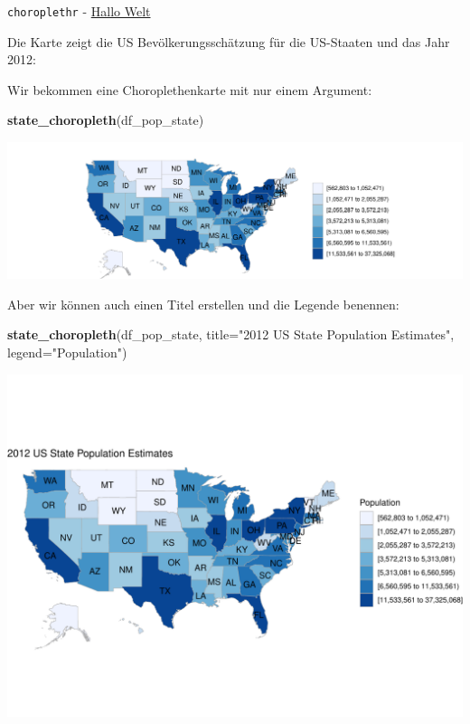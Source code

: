 \documentclass[ignorenonframetext,]{beamer}
\newenvironment{Shaded}{\begin{snugshade}}{\end{snugshade}}
\newcommand{\DataTypeTok}[1]{\textcolor[rgb]{0.13,0.29,0.53}{#1}}
\newcommand{\KeywordTok}[1]{\textcolor[rgb]{0.13,0.29,0.53}{\textbf{#1}}}
\newcommand{\NormalTok}[1]{#1}
\newcommand{\StringTok}[1]{\textcolor[rgb]{0.31,0.60,0.02}{#1}}
\begin{document}
\begin{frame}[fragile]{\texttt{choroplethr} -
\href{http://mirrors.softliste.de/cran/web/packages/choroplethr/vignettes/a-introduction.html}{Hallo
Welt}}
\protect\hypertarget{choroplethr---hallo-welt}{}

Die Karte zeigt die US Bevölkerungsschätzung für die US-Staaten und das
Jahr 2012:

Wir bekommen eine Choroplethenkarte mit nur einem Argument:

\begin{Shaded}
\begin{Highlighting}[]
\KeywordTok{state_choropleth}\NormalTok{(df_pop_state)}
\end{Highlighting}
\end{Shaded}

\includegraphics{Choroplethen_files/figure-beamer/unnamed-chunk-18-1.pdf}

Aber wir können auch einen Titel erstellen und die Legende benennen:

\begin{Shaded}
\begin{Highlighting}[]
\KeywordTok{state_choropleth}\NormalTok{(df_pop_state, }\DataTypeTok{title=}\StringTok{"2012 US State Population Estimates"}\NormalTok{, }\DataTypeTok{legend=}\StringTok{"Population"}\NormalTok{)}
\end{Highlighting}
\end{Shaded}

\includegraphics{Choroplethen_files/figure-beamer/unnamed-chunk-19-1.pdf}

\end{frame}
\end{document}
